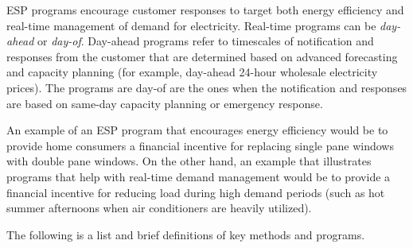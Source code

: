 ESP programs encourage customer responses to target both energy efficiency and real-time management of demand for electricity. Real-time programs can be \emph{day-ahead} or \emph{day-of}. Day-ahead programs refer to timescales of notification and responses from the customer that are determined based on advanced forecasting and capacity planning (for example, day-ahead 24-hour wholesale electricity prices). The programs are day-of are the ones when the notification and responses are based on same-day capacity planning or emergency response. 

An example of an ESP program 
that encourages energy efficiency would be to provide home consumers a financial incentive for replacing 
single pane windows with double pane windows. On the other hand, an example that illustrates programs that help 
with real-time demand management would be to provide a financial incentive for reducing load 
during high demand periods (such as hot summer afternoons when air conditioners are heavily utilized). 

The following is a list and brief definitions of key methods and programs.  

